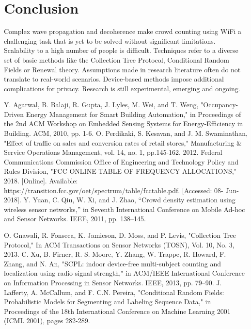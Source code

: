 \documentclass[conference]{IEEEtran}
\begin{document}
\section{Conclusion}
Complex wave propagation and decoherence make crowd counting using WiFi a challenging task that is yet to be solved without significant limitations. Scalability to a high number of people is difficult. Techniques refer to a diverse set of basic methods like the Collection Tree Protocol, Conditional Random Fields or Renewal theory. Assumptions made in research literature often do not translate to real-world scenarios. Device-based methods impose additional complications for privacy. Research is still experimental, emerging and ongoing.




\begin{thebibliography}{00}
 Y. Agarwal, B. Balaji, R. Gupta, J. Lyles, M. Wei, and T. Weng, 
"Occupancy-Driven Energy Management for Smart Building Automation," in Proceedings of the 2nd ACM Workshop on Embedded Sensing Systems for Energy-Efficiency in Building. ACM, 2010, pp. 1-6.
 O. Perdikaki, S. Kesavan, and J. M. Swaminathan, "Effect of traffic on sales and conversion rates of retail stores," Manufacturing \& Service Operations Management, vol. 14, no. 1, pp.145-162, 2012.
 Federal Communications Commission Office of Engineering and Technology Policy and Rules Division, "FCC ONLINE TABLE OF FREQUENCY ALLOCATIONS," 2018. [Online]. Available: https://transition.fcc.gov/oet/spectrum/table/fcctable.pdf. [Accessed: 08- Jun- 2018].
 Y. Yuan, C. Qiu, W. Xi, and J. Zhao, “Crowd density estimation using wireless sensor networks,” in Seventh International Conference on Mobile Ad-hoc and Sensor Networks. IEEE, 2011, pp. 138–145.


 O. Gnawali, R. Fonseca, K. Jamieson, D. Moss, and P. Levis, "Collection Tree Protocol," In ACM Transactions on Sensor Networks (TOSN), Vol. 10, No. 3, 2013.
 C. Xu, B. Firner, R. S. Moore, Y. Zhang, W. Trappe, R. Howard, F. Zhang, and N. An, "SCPL: indoor device-free multi-subject counting and localization using radio signal strength," in ACM/IEEE International Conference on Information Processing in Sensor Networks. IEEE, 2013, pp. 79–90.
 J. Lafferty, A. McCallum, and F. C.N. Pereira, "Conditional Random Fields: Probabilistic Models for Segmenting and Labeling Sequence Data," in Proceedings of the 18th International Conference on Machine Learning 2001 (ICML 2001), pages 282-289.


\end{thebibliography}
\end{document}
